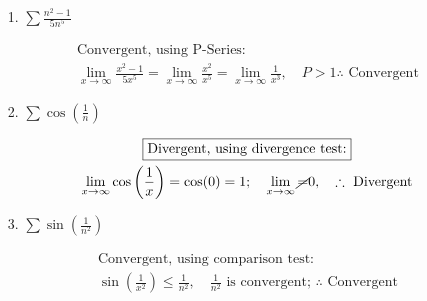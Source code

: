     \begin{itemize}
        \item [1.]
        $\sum\frac{n^{2}-1}{5n^{5}}$
        \\
        \begin{mdframed}
            \begin{equation*}
                \begin{gathered}
                    \boxed{\text{Convergent, using P-Series:}}                      \\
                      \lim_{x \to \infty}\frac{x^{2}-1}{5x^{5}}
                    = \lim_{x \to \infty}\frac{x^{2}}{x^{5}} 
                    = \lim_{x \to \infty}\frac{1}{x^{3}}, \quad 
                    P > 1 \therefore \text{ Convergent}
                \end{gathered}
            \end{equation*}
        \end{mdframed}
    
        \item [2.]
        $\sum\cos\left(\frac{1}{n}\right)$
        \\
        \begin{mdframed}
            \begin{equation*}
                \begin{gathered}
                    \boxed{\text{Divergent, using divergence test:}}                \\
                    \lim_{x \to \infty} \cos\left(\frac{1}{x}\right) = \cos(0) = 1;
                    \quad \lim_{x \to \infty} \cancel{=} 0, \quad \therefore 
                    \text{ Divergent}
                \end{gathered}
            \end{equation*}
        \end{mdframed}

        \item [3.]
        $\sum\sin\left(\frac{1}{n^{2}}\right)$
        \\
        \begin{mdframed}
            \begin{equation*}
                \begin{gathered}
                    \boxed{\text{Convergent, using comparison test:}}                       \\
                    \sin\left(\frac{1}{x^{2}}\right) \leq \frac{1}{n^{2}},
                    \quad \frac{1}{n^{2}} \text{ is convergent; } \therefore
                    \text{ Convergent}
                \end{gathered}
            \end{equation*}
        \end{mdframed}


\end{itemize}
